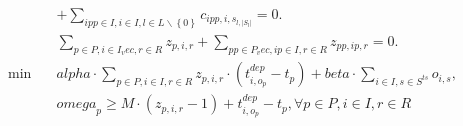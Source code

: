 \begin{align}
  & + \sum_{ipp \in {I}, i \in I, l \in L \backslash \left\{0\right\}} c_{ipp , i , s_{l , \left|S_{l}\right|}} = 0 . \tag{eq\_0033} \\
  & \sum_{p \in {P}, i \in I_vec, r \in R} z_{p , i , r} + \sum_{pp \in P_vec, ip \in {I}, r \in R} z_{pp , ip , r} = 0 . \tag{eq\_0034} \\
  \min\quad & \mathit{alpha} \cdot \sum_{p \in P, i \in I, r \in R} z_{p , i , r} \cdot \left(t_{i , o_{p}}^{d e p} - t_{p}\right) + \mathit{beta} \cdot \sum_{i \in I, s \in S^{t s}} o_{i , s} , \tag{eq\_0037} \\
  & \mathit{omega}_{p} \geq M \cdot \left(z_{p , i , r} - 1\right) + t_{i , o_{p}}^{d e p} - t_{p} , \forall p \in P , i \in I , r \in R \tag{eq\_0060} \\
\end{align}
